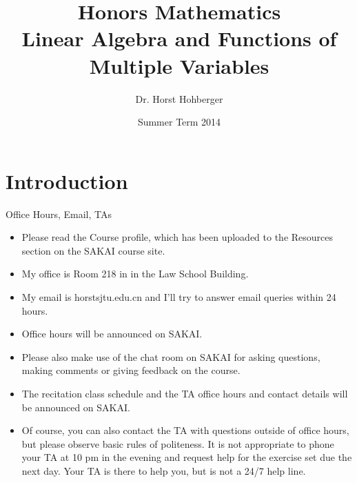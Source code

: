 \documentclass[smaller,hyperref={CJKbookmarks=true}]{beamer}
\begin{document}
\title[Functions of Multiple Variables]{\large{Honors Mathematics \\ Linear Algebra and Functions of Multiple Variables}}
\author[Dr. Hohberger]{Dr. Horst Hohberger}
\date[Summer 2014]{Summer Term 2014}
\begin{frame} \titlepage \end{frame}
\setcounter{section}{-1}
\section{Introduction}
\begin{spacing}{1.2}
\begin{frame}[t,squeeze]{Of{}fice Hours, Email, TAs}
\begin{itemize}
  \item Please read the Course profile, which has been uploaded to the
Resources section on the SAKAI course site.
  \item My of{}fice is Room 218 in in the Law School Building.
  \item My email is horst\@ sjtu.edu.cn and I'll try to answer email queries
within 24 hours.
  \item Of{}fice hours will be announced on SAKAI.
  \item Please also make use of the chat room on SAKAI for asking
questions, making comments or giving feedback on the course.
  \item The recitation class schedule and the TA of{}fice hours and contact
details will be announced on SAKAI.
  \item Of course, you can also contact the TA with questions outside of
of{}fice hours, but please observe basic rules of politeness. It is not
appropriate to phone your TA at 10 pm in the evening and request
help for the exercise set due the next day. Your TA is there to help
you, but is not a 24/7 help line.
\end{itemize}
\end{frame}
\end{spacing}
\end{document}
